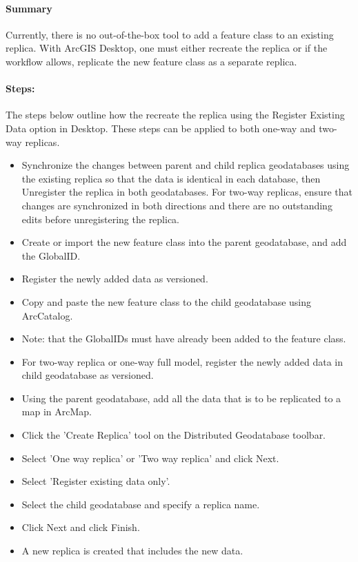 \documentclass[class=article , crop=false, titlepage, twoside, multi={itemize, figure, verbatim}, float=false]{standalone}
\begin{document}
\begin{adjmulticols}{2}{\innerMar}{\outerMar}
\paragraph[Summary]{Summary \texorpdfstring{\\}{}}
Currently, there is no out-of-the-box tool to add a feature class to an existing replica. With ArcGIS Desktop, one must either recreate the replica or if the workflow allows, replicate the new feature class as a separate replica.
\paragraph[Steps]{Steps:\texorpdfstring{\\}{}}
The steps below outline how the recreate the replica using the Register Existing Data option in Desktop. These steps can be applied to both one-way and two-way replicas.
\begin{itemize}
\item Synchronize the changes between parent and child replica geodatabases using the existing replica so that the data is identical in each database, then Unregister the replica in both geodatabases. For two-way replicas, ensure that changes are synchronized in both directions and there are no outstanding edits before unregistering the replica.
\item Create or import the new feature class into the parent geodatabase, and add the GlobalID.
\item Register the newly added data as versioned.
\item Copy and paste the new feature class to the child geodatabase using ArcCatalog.
\item Note: that the GlobalIDs must have already been added to the feature class.
\item For two-way replica or one-way full model, register the newly added data in child geodatabase as versioned.
\item Using the parent geodatabase, add all the data that is to be replicated to a map in ArcMap.
\item Click the 'Create Replica' tool on the Distributed Geodatabase toolbar.
\item Select 'One way replica' or 'Two way replica' and click Next.
\item Select 'Register existing data only'.
\item Select the child geodatabase and specify a replica name.
\item Click Next and click Finish.
\item A new replica is created that includes the new data.
\end{itemize}
\end{adjmulticols}
\end{document}
